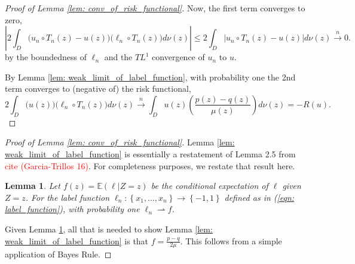 \documentclass{article}
\newcommand{\abs}[1]{\left \lvert #1 \right \rvert}
\newcommand{\set}[1]{\left\{#1\right\}}
\newcommand{\1}{\mathbf{1}}
\theoremstyle{alden}
\theoremstyle{aldenthm}
\newtheorem{lemma}{Lemma}
\theoremstyle{remark}
\begin{document}
\begin{proof}[Proof of Lemma \ref{lem: conv_of_risk_functional}]
	Now, the first term converges to zero,
	\begin{equation*}
	\abs{2 \int_D  \bigl(u_n \circ T_n (z)  - u(z) \bigr) \bigl( \ell_n \circ T_n (z)  \bigr) d\nu(z)} \leq 2 \int_D \abs{u_n \circ T_n (z)  - u(z)} d\nu(z) \overset{n}{\to} 0.
	\end{equation*}
	by the boundedness of $\ell_n$ and the $TL^1$ convergence of $u_n$ to $u$.
	
	By Lemma \ref{lem: weak_limit_of_label_function}, with probability one the 2nd term converges to (negative of) the risk functional,
	\begin{equation*}
	2 \int_D  \bigl(u(z) \bigr) \bigl( \ell_n \circ T_n (z)  \bigr) d\nu(z) \overset{n}{\to} \int_D u(z) \left(\frac{p(z) - q(z)}{\mu(z)}\right) d\nu(z) = -R(u).
	\end{equation*}
\end{proof}

\begin{proof}[Proof of Lemma \ref{lem: conv_of_risk_functional}]
	Lemma \ref{lem: weak_limit_of_label_function} is essentially a restatement of Lemma 2.5 from \textcolor{red}{cite (Garcia-Trillos 16)}. For completeness purposes, we restate that result here.
	
	\begin{lemma}
		\label{lem: weak_conv_label_function}
		Let $f(z) = \mathbb{E}(\ell \vert Z = z)$ be the conditional expectation of $\ell$ given $Z = z$.  
		For the label function $\ell_n: \set{x_1, \ldots, x_n} \to \set{-1,1}$ defined as in (\ref{eqn: label_function}), with probability one $\ell_n \rightharpoonup f$.
	\end{lemma}
	Given Lemma \ref{lem: weak_conv_label_function}, all that is needed to show Lemma \ref{lem: weak_limit_of_label_function} is that $f = \frac{p - q}{2\mu}$. This follows from a simple application of Bayes Rule. 
\end{proof}
	
\end{document}
